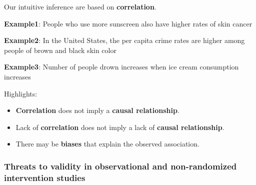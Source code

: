 \documentclass[
  letterpaper,
  DIV=11,
  numbers=noendperiod]{scrartcl}
\providecommand{\tightlist}{%
  \setlength{\itemsep}{0pt}\setlength{\parskip}{0pt}}\usepackage{longtable,booktabs,array}
\begin{document}
Our intuitive inference are based on \textbf{correlation}.

\textbf{Example1}: People who use more sunscreen also have higher rates
of skin cancer

\textbf{Example2}: In the United States, the per capita crime rates are
higher among people of brown and black skin color

\textbf{Example3}: Number of people drown increases when ice cream
consumption increases

Highlights:

\begin{itemize}
\tightlist
\item
  \textbf{Correlation} does not imply a \textbf{causal relationship}.
\item
  Lack of \textbf{correlation} does not imply a lack of \textbf{causal
  relationship}.
\item
  There may be \textbf{biases} that explain the observed association.
\end{itemize}

\subsubsection{Threats to validity in observational and non-randomized
intervention
studies}\label{threats-to-validity-in-observational-and-non-randomized-intervention-studies}
\end{document}
